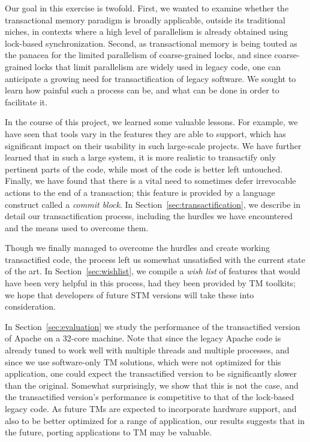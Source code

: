 \documentclass[preprint,11pt]{sigplanconf}
\begin{document}
Our goal in this exercise is twofold. First, we wanted to examine whether the transactional 
memory paradigm is broadly applicable, outside its traditional niches, in contexts where a 
high level of parallelism is already obtained using lock-based synchronization. 
%
Second, as transactional memory is being touted as the panacea for the limited parallelism 
of coarse-grained locks, and since coarse-grained locks that limit parallelism are widely used 
in legacy code, one can anticipate a growing need for transactification of legacy software. 
We sought to learn how painful such a process can be, and what can be done in order to 
facilitate it.

In the course of this project, we learned some valuable lessons.
For example, we have seen that tools vary in the features they are able
to support, which has significant impact on their usability in 
such large-scale projects. We have further learned that in such a large
system, it is more realistic to transactify only pertinent parts of the code,
while most of the code is better left untouched. Finally, we have found
that there is a vital need to sometimes defer irrevocable actions to
the end of a transaction; this feature is provided by a language construct called 
a \emph{commit block}. In Section~\ref{sec:transactification}, 
we describe in detail our transactification
process, including the hurdles we have encountered and the means used to
overcome them.

Though we finally managed to overcome the hurdles and create working transactified 
code, the process left us somewhat unsatisfied with the current state of the art. 
In Section~\ref{sec:wishlist}, we compile a \emph{wish list} of features 
that would have been very helpful in this process, had they been provided
by TM toolkits; we hope that developers of future STM versions
will take these into consideration. 

In Section~\ref{sec:evaluation} we study the performance of the transactified 
version of Apache on a 32-core machine. 
Note that since the legacy Apache code is already 
tuned to work well with multiple threads and multiple processes, 
and since we use software-only TM solutions, which were not optimized for this 
application, one could expect the transactified version to be significantly
slower than the original.
Somewhat surprisingly, we show that this is not the case, and the 
transactified 
version's performance is competitive to that of the lock-based legacy code. 
As future TMs are expected to incorporate hardware support, and also 
to be better optimized for a range of application, our results 
suggests that in the future, porting applications to TM may be valuable.
\end{document}
